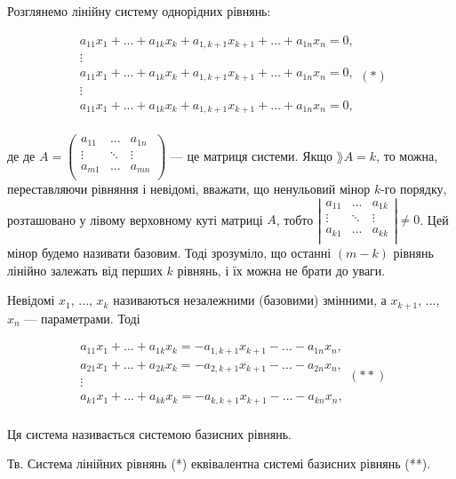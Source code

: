 Розглянемо лінійну систему однорідних рівнянь:

$$\begin{matrix}
	a_{11} x_1 + ... + a_{1k} x_k + a_{1,k+1} x_{k+1} + ... + a_{1n} x_n = 0, \\
	\vdots \\
	a_{11} x_1 + ... + a_{1k} x_k + a_{1,k+1} x_{k+1} + ... + a_{1n} x_n = 0, \\
	\vdots \\
	a_{11} x_1 + ... + a_{1k} x_k + a_{1,k+1} x_{k+1} + ... + a_{1n} x_n = 0, \\
\end{matrix} (*)$$

де де $A = \begin{pmatrix}
	a_{11} & ...    & a_{1n} \\
	\vdots & \ddots & \vdots \\
	a_{m1} & ...    & a_{mn} \\
\end{pmatrix}$ --- це матриця системи. Якщо $\rang A = k$, то можна,
переставляючи рівняння і невідомі, вважати, що ненульовий мінор $k$-го порядку,
розташовано у лівому верховному куті матриці $A$, тобто $\left| \begin{matrix}
	a_{11} & ...    & a_{1k} \\
	\vdots & \ddots & \vdots \\
	a_{k1} & ...    & a_{kk} \\
\end{matrix} \right| \neq 0$. Цей
мінор будемо називати базовим. Тоді зрозуміло, що останні $(m - k)$ рівнянь лінійно
залежать від перших $k$ рівнянь, і їх можна не брати до уваги.


Невідомі $x_1$, ..., $x_k$ називаються незалежними (базовими) змінними, а $x_{k+1}$, ..., $x_n$ ---
параметрами. Тоді

$$\begin{matrix}
	a_{11} x_1 + ... + a_{1k} x_k = -a_{1,k+1} x_{k+1} - ... - a_{1n} x_n, \\
	a_{21} x_1 + ... + a_{2k} x_k = -a_{2,k+1} x_{k+1} - ... - a_{2n} x_n, \\
	\vdots \\
	a_{k1} x_1 + ... + a_{kk} x_k = -a_{k,k+1} x_{k+1} - ... - a_{kn} x_n, \\
\end{matrix} (**)$$


Ця система називається системою базисних рівнянь.


Тв. Система лінійних рівнянь (*) еквівалентна системі базисних рівнянь (**).


